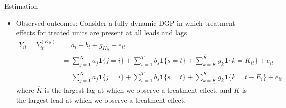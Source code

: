 \documentclass[12pt]{article}
\theoremstyle{plain}
\theoremstyle{definition}
\theoremstyle{remark}
\begin{document}
\clearpage
Estimation
\begin{itemize}
  \item Observed outcomes:
    Consider a fully-dynamic DGP in which treatment effects for treated
    units are present at all leads and lags
    \begin{align*}
      Y_{it}
      =
      Y_{it}^{(K_{it})}
      &=
      a_i
      +
      b_t
      +
      g_{K_{it}}
      +
      e_{it}
      \\
      &=
      \sum_{j=1}^N
      a_j\mathbf{1}\{j=i\}
      +
      \sum_{s=1}^T
      b_s\mathbf{1}\{s=t\}
      +
      \sum_{k=\underline{K}}^{\overline{K}}
      g_{k}
      \mathbf{1}\{k=K_{it}\}
      +
      e_{it}
      \\
      &=
      \sum_{j=1}^N
      a_j\mathbf{1}\{j=i\}
      +
      \sum_{s=1}^T
      b_s\mathbf{1}\{s=t\}
      +
      \sum_{k=\underline{K}}^{\overline{K}}
      g_{k}
      \mathbf{1}\{k=t-E_i\}
      +
      e_{it}
    \end{align*}
    where $\overline{K}$ is the largest lag at which we observe a
    treatment effect, and $\underline{K}$ is the largest lead at which
    we observe a treatment effect.


\end{itemize}
\end{document}
